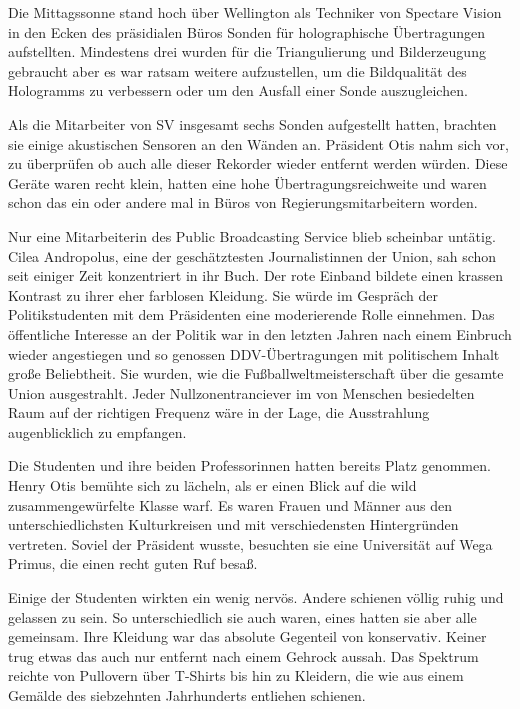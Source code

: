Die Mittagssonne stand hoch über Wellington als Techniker von Spectare Vision in den Ecken des präsidialen Büros Sonden für holographische Übertragungen aufstellten. Mindestens drei wurden für die Triangulierung und Bilderzeugung gebraucht aber es war ratsam weitere aufzustellen, um die Bildqualität des Hologramms zu verbessern oder um den Ausfall einer Sonde auszugleichen.

\par

Als die Mitarbeiter von SV insgesamt sechs Sonden aufgestellt hatten, brachten sie einige akustischen Sensoren an den Wänden an. Präsident Otis nahm sich vor, zu überprüfen ob auch alle dieser Rekorder wieder entfernt werden würden. Diese Geräte waren recht klein, hatten eine hohe Übertragungsreichweite und waren schon das ein oder andere mal in Büros von Regierungsmitarbeitern  worden.

\par

Nur eine Mitarbeiterin des Public Broadcasting Service blieb scheinbar untätig. Cilea Andropolus, eine der geschätztesten Journalistinnen der Union, sah schon seit einiger Zeit konzentriert in ihr Buch. Der rote Einband bildete einen krassen Kontrast zu ihrer eher farblosen Kleidung. Sie würde im Gespräch der Politikstudenten mit dem Präsidenten eine moderierende Rolle einnehmen. Das öffentliche Interesse an der Politik war in den letzten Jahren nach einem Einbruch wieder angestiegen und so genossen DDV-Übertragungen mit politischem Inhalt große Beliebtheit. Sie wurden, wie die Fußballweltmeisterschaft über die gesamte Union ausgestrahlt. Jeder Nullzonentranciever im von Menschen besiedelten Raum auf der richtigen Frequenz wäre in der Lage, die Ausstrahlung augenblicklich zu empfangen.

\par

Die Studenten und ihre beiden Professorinnen hatten bereits Platz genommen. Henry Otis bemühte sich zu lächeln, als er einen Blick auf die wild zusammengewürfelte Klasse warf. Es waren Frauen und Männer aus den unterschiedlichsten Kulturkreisen und mit verschiedensten Hintergründen vertreten. Soviel der Präsident wusste, besuchten sie eine Universität auf Wega Primus, die einen recht guten Ruf besaß.

\par

Einige der Studenten wirkten ein wenig nervös. Andere schienen völlig ruhig und gelassen zu sein. So unterschiedlich sie auch waren, eines hatten sie aber alle gemeinsam. Ihre Kleidung war das absolute Gegenteil von konservativ. Keiner trug etwas das auch nur entfernt nach einem Gehrock aussah. Das Spektrum reichte von Pullovern über T-Shirts bis hin zu Kleidern, die wie aus einem Gemälde des siebzehnten Jahrhunderts entliehen schienen.

